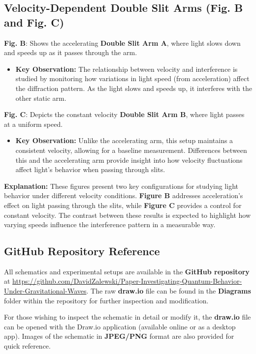 \documentclass{article}
\begin{document}
\subsection{Velocity-Dependent Double Slit Arms (Fig. B and Fig. C)}

\textbf{Fig. B}: Shows the accelerating \textbf{Double Slit Arm A}, where light slows down and speeds up as it passes through the arm.
\begin{itemize}
    \item \textbf{Key Observation:} The relationship between velocity and interference is studied by monitoring how variations in light speed (from acceleration) affect the diffraction pattern. As the light slows and speeds up, it interferes with the other static arm.
\end{itemize}

\textbf{Fig. C}: Depicts the constant velocity \textbf{Double Slit Arm B}, where light passes at a uniform speed.
\begin{itemize}
    \item \textbf{Key Observation:} Unlike the accelerating arm, this setup maintains a consistent velocity, allowing for a baseline measurement. Differences between this and the accelerating arm provide insight into how velocity fluctuations affect light’s behavior when passing through slits.
\end{itemize}

\textbf{Explanation:} These figures present two key configurations for studying light behavior under different velocity conditions. \textbf{Figure B} addresses acceleration's effect on light passing through the slits, while \textbf{Figure C} provides a control for constant velocity. The contrast between these results is expected to highlight how varying speeds influence the interference pattern in a measurable way.

\subsection{GitHub Repository Reference}

All schematics and experimental setups are available in the \textbf{GitHub repository} at \url{https://github.com/DavidZalewski/Paper-Investigating-Quantum-Behavior-Under-Gravitational-Waves}. The raw \textbf{draw.io} file can be found in the \textbf{Diagrams} folder within the repository for further inspection and modification.

For those wishing to inspect the schematic in detail or modify it, the \textbf{draw.io} file can be opened with the Draw.io application (available online or as a desktop app). Images of the schematic in \textbf{JPEG/PNG} format are also provided for quick reference.
\end{document}
